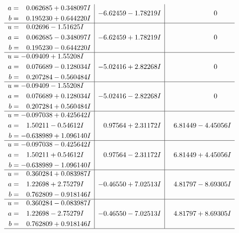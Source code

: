 \documentclass[1p]{elsarticle_modified}
\theoremstyle{definition}
\begin{document}
$$\begin{array}{c|c|c}
\begin{aligned}
a &= \phantom{-}0.062685 + 0.348097 I \\
b &= \phantom{-}0.195230 + 0.644220 I\end{aligned}
 & -6.62459 - 1.78219 I & \phantom{-0.000000 } 0 \\ \hline\begin{aligned}
u &= \phantom{-}0.02696 - 1.51625 I \\
a &= \phantom{-}0.062685 - 0.348097 I \\
b &= \phantom{-}0.195230 - 0.644220 I\end{aligned}
 & -6.62459 + 1.78219 I & \phantom{-0.000000 } 0 \\ \hline\begin{aligned}
u &= -0.09409 + 1.55208 I \\
a &= \phantom{-}0.076689 - 0.128034 I \\
b &= \phantom{-}0.207284 - 0.560484 I\end{aligned}
 & -5.02416 + 2.82268 I & \phantom{-0.000000 } 0 \\ \hline\begin{aligned}
u &= -0.09409 - 1.55208 I \\
a &= \phantom{-}0.076689 + 0.128034 I \\
b &= \phantom{-}0.207284 + 0.560484 I\end{aligned}
 & -5.02416 - 2.82268 I & \phantom{-0.000000 } 0 \\ \hline\begin{aligned}
u &= -0.097038 + 0.425642 I \\
a &= \phantom{-}1.50211 - 0.54612 I \\
b &= -0.638989 + 1.096140 I\end{aligned}
 & \phantom{-}0.97564 + 2.31172 I & \phantom{-}6.81449 - 4.45056 I \\ \hline\begin{aligned}
u &= -0.097038 - 0.425642 I \\
a &= \phantom{-}1.50211 + 0.54612 I \\
b &= -0.638989 - 1.096140 I\end{aligned}
 & \phantom{-}0.97564 - 2.31172 I & \phantom{-}6.81449 + 4.45056 I \\ \hline\begin{aligned}
u &= \phantom{-}0.360284 + 0.083987 I \\
a &= \phantom{-}1.22698 + 2.75279 I \\
b &= \phantom{-}0.762809 - 0.918146 I\end{aligned}
 & -0.46550 + 7.02513 I & \phantom{-}4.81797 - 8.69305 I \\ \hline\begin{aligned}
u &= \phantom{-}0.360284 - 0.083987 I \\
a &= \phantom{-}1.22698 - 2.75279 I \\
b &= \phantom{-}0.762809 + 0.918146 I\end{aligned}
 & -0.46550 - 7.02513 I & \phantom{-}4.81797 + 8.69305 I\\
 \hline 
 \end{array}$$\newpage\newpage\renewcommand{\arraystretch}{1}
\end{document}
